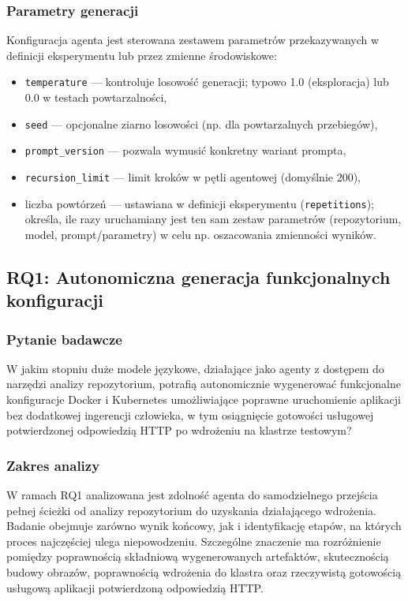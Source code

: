 \subsubsection{Parametry generacji}

Konfiguracja agenta jest sterowana zestawem parametrów przekazywanych w definicji eksperymentu lub przez zmienne środowiskowe:
\begin{itemize}
    \item \texttt{temperature} — kontroluje losowość generacji; typowo 1.0 (eksploracja) lub 0.0 w testach powtarzalności,
    \item \texttt{seed} — opcjonalne ziarno losowości (np. dla powtarzalnych przebiegów),
    \item \texttt{prompt\_version} — pozwala wymusić konkretny wariant prompta,
    \item \texttt{recursion\_limit} — limit kroków w pętli agentowej (domyślnie 200),
    \item liczba powtórzeń — ustawiana w definicji eksperymentu (\texttt{repetitions}); określa, ile razy uruchamiany jest ten sam zestaw parametrów (repozytorium, model, prompt/parametry) w celu np. oszacowania zmienności wyników.
\end{itemize}

\subsection{RQ1: Autonomiczna generacja funkcjonalnych konfiguracji}

\subsubsection{Pytanie badawcze}

W jakim stopniu duże modele językowe, działające jako agenty z dostępem do narzędzi analizy repozytorium, potrafią autonomicznie wygenerować funkcjonalne konfiguracje Docker i Kubernetes umożliwiające poprawne uruchomienie aplikacji bez dodatkowej ingerencji człowieka, w tym osiągnięcie gotowości usługowej potwierdzonej odpowiedzią HTTP po wdrożeniu na klastrze testowym?

\subsubsection{Zakres analizy}

W ramach RQ1 analizowana jest zdolność agenta do samodzielnego przejścia pełnej ścieżki od analizy repozytorium do uzyskania działającego wdrożenia. Badanie obejmuje zarówno wynik końcowy, jak i identyfikację etapów, na których proces najczęściej ulega niepowodzeniu. Szczególne znaczenie ma rozróżnienie pomiędzy poprawnością składniową wygenerowanych artefaktów, skutecznością budowy obrazów, poprawnością wdrożenia do klastra oraz rzeczywistą gotowością usługową aplikacji potwierdzoną odpowiedzią HTTP.

